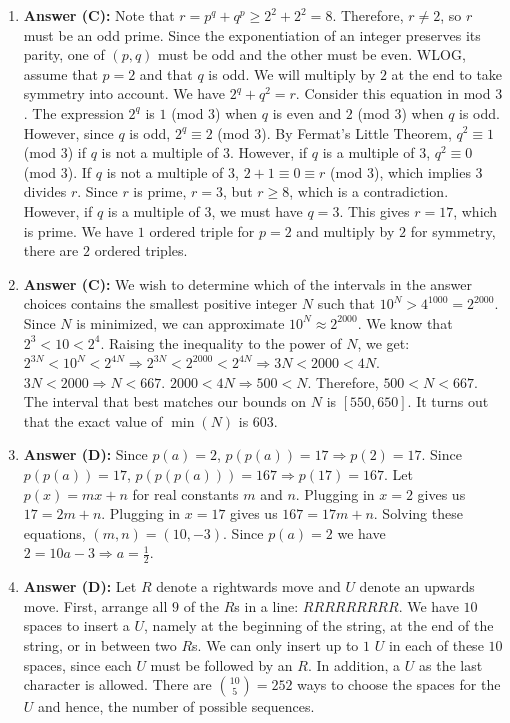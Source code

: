 \documentclass{article}
\begin{document}
\begin{enumerate}
\item \textbf{Answer (C):} Note that $r=p^{q}+q^{p}\ge2^{2}+2^{2}=8$. Therefore, $r\ne2$, so $r$ must be an odd prime. Since the exponentiation of an integer preserves its parity, one of $(p, q)$ must be odd and the other must be even. WLOG, assume that $p=2$ and that $q$ is odd. We will multiply by $2$ at the end to take symmetry into account. We have $2^{q}+q^{2}=r$. Consider this equation in mod $3$. The expression $2^{q}$ is $1$ (mod $3$) when $q$ is even and $2$ (mod $3$) when $q$ is odd. However, since $q$ is odd, $2^{q}\equiv2$ (mod $3$). By Fermat's Little Theorem, $q^{2}\equiv1$ (mod $3$) if $q$ is not a multiple of $3$. However, if $q$ is a multiple of $3$, $q^{2}\equiv0$ (mod $3$). If $q$ is not a multiple of $3$, $2+1\equiv0\equiv r$ (mod $3$), which implies $3$ divides $r$. Since $r$ is prime, $r=3$, but $r\ge8$, which is a contradiction. However, if $q$ is a multiple of $3$, we must have $q=3$. This gives $r=17$, which is prime. We have $1$ ordered triple for $p=2$ and multiply by $2$ for symmetry, there are $2$ ordered triples.

\item \textbf{Answer (C):} We wish to determine which of the intervals in the answer choices contains the smallest positive integer $N$ such that $10^{N}>4^{1000}=2^{2000}$. Since $N$ is minimized, we can approximate $10^{N}\approx2^{2000}$. We know that $2^{3}<10<2^{4}$. Raising the inequality to the power of $N$, we get: $2^{3N}<10^{N}<2^{4N}\Rightarrow2^{3N}<2^{2000}<2^{4N}\Rightarrow3N<2000<4N$. $3N<2000\Rightarrow N<667$. $2000<4N\Rightarrow500<N$. Therefore, $500<N<667$. The interval that best matches our bounds on $N$ is $[550,650]$. It turns out that the exact value of $\min(N)$ is $603$.

\item \textbf{Answer (D):} Since $p(a)=2$, $p(p(a))=17\Rightarrow p(2)=17$. Since $p(p(a))=17$, $p(p(p(a)))=167\Rightarrow p(17)=167$. Let $p(x)=mx+n$ for real constants $m$ and $n$. Plugging in $x=2$ gives us $17=2m+n$. Plugging in $x=17$ gives us $167=17m+n$. Solving these equations, $(m,n)=(10,-3)$. Since $p(a)=2$ we have $2=10a-3\Rightarrow a=\frac{1}{2}$.

\item \textbf{Answer (D):} Let $R$ denote a rightwards move and $U$ denote an upwards move. First, arrange all $9$ of the $R$s in a line: $RRRRRRRRR$. We have $10$ spaces to insert a $U$, namely at the beginning of the string, at the end of the string, or in between two $R$s. We can only insert up to $1$ $U$ in each of these $10$ spaces, since each $U$ must be followed by an $R$. In addition, a $U$ as the last character is allowed. There are $\binom{10}{5}=252$ ways to choose the spaces for the $U$ and hence, the number of possible sequences.


\end{enumerate}
\end{document}
